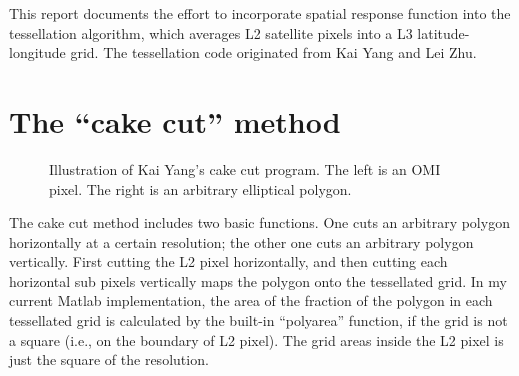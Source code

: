 \documentclass[hidelinks,12pt]{article}
\begin{document}
\maketitle
\abstract
This report documents the effort to incorporate spatial response function into the tessellation algorithm, which averages L2 satellite pixels into a L3 latitude-longitude grid. The tessellation code originated from Kai Yang and Lei Zhu.

\section{The ``cake cut'' method}

\begin{figure}[hbtp]
 \centering
 \quad \quad
{}  \caption{Illustration of Kai Yang's cake cut program. The left is an OMI pixel. The right is an arbitrary elliptical polygon.}
    \label{fig1}
\end{figure}
\FloatBarrier
The cake cut method includes two basic functions. One cuts an arbitrary polygon horizontally at a certain resolution; the other one cuts an arbitrary polygon vertically. First cutting the L2 pixel horizontally, and then cutting each horizontal sub pixels vertically maps the polygon onto the tessellated grid. In my current Matlab implementation, the area of the fraction of the polygon in each tessellated grid is calculated by the built-in ``polyarea'' function, if the grid is not a square (i.e., on the boundary of L2 pixel). The grid areas inside the L2 pixel is just the square of the resolution.
\end{document}
